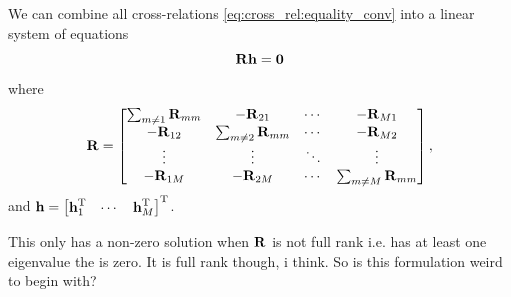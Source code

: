 \documentclass{article}
\newcommand{\h}{\mtxb{h}}
\newcommand{\R}{\mtxb{R}}
\begin{document}
We can combine all cross-relations \eqref{eq:cross_rel:equality_conv} into a linear system of equations
\begin{equation}
    \R \h = \bm{0} \label{eq:cross_rel:null_space}\\
\end{equation}
where 
\begin{equation}
    \R = \begin{bmatrix}
        \sum_{m \neq 1} \R_{mm} & -\R_{21} & \cdots & -\R_{M1}\\
        -\R_{12} & \sum_{m \neq 2} \R_{mm} & \cdots & -\R_{M2}\\
        \vdots & \vdots & \ddots & \vdots\\
        -\R_{1M} & -\R_{2M} & \cdots & \sum_{m \neq M} \R_{mm}\\
    \end{bmatrix},\label{eq:cross_rel:data_matrix}
\end{equation}
and \(\h = \begin{bmatrix}
    \h_1^\T & \cdots & \h_M^\T
\end{bmatrix}^\T\).

\begin{note}
    This only has a non-zero solution when \(\R\) is not full rank i.e. has at least one eigenvalue the is zero. It is full rank though, i think. So is this formulation weird to begin with?
\end{note}
\end{document}
